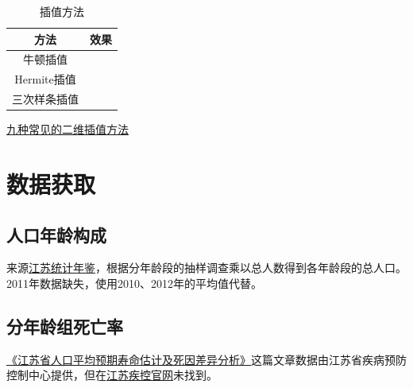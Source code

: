 \documentclass{article}
\numberwithin{figure}{section}
\numberwithin{equation}{section}
\numberwithin{table}{section}
\begin{document}
\begin{table}[h!]
  \begin{center}
    \caption{插值方法}
    \begin{tabular}{cc} %
\toprule
方法 & 效果 \\
\midrule
牛顿插值 & \\
Hermite插值 & \\
三次样条插值 & \\
\bottomrule
    \end{tabular}
  \end{center}
\end{table}

\href{https://blog.csdn.net/yanfeng1022/article/details/114528323}{九种常见的二维插值方法}

\section{数据获取}
\subsection{人口年龄构成}
来源\href{https://tj.jiangsu.gov.cn/col/col89815/index.html}{江苏统计年鉴}，根据分年龄段的抽样调查乘以总人数得到各年龄段的总人口。2011年数据缺失，使用2010、2012年的平均值代替。
\subsection{分年龄组死亡率}
\href{https://qikan.cqvip.com/Qikan/Article/Detail?id=7107031310}{《江苏省人口平均预期寿命估计及死因差异分析》}这篇文章数据由江苏省疾病预防控制中心提供，但在\href{https://www.jscdc.cn/xxgk_1641/}{江苏疾控官网}未找到。
\printbibliography
\end{document}

